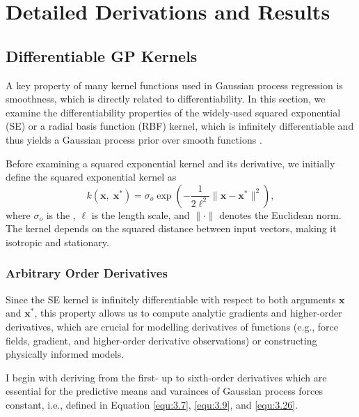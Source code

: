 \chapter{Detailed Derivations and Results} \label{c:A}

\section{Differentiable GP Kernels} \label{sec:A.1}

A key property of many kernel functions used in Gaussian process regression is smoothness, which is directly related to differentiability. In this section, we examine the differentiability properties of the widely-used squared exponential (SE) or a radial basis function (RBF) kernel, which is infinitely differentiable and thus yields a Gaussian process prior over smooth functions \cite{RasmussenW06, Solak2002}.

Before examining a squared exponential kernel and its derivative, we initially define the squared exponential kernel as
\begin{equation} \label{equ:A.1}
    k(\mathbf{x},\;\mathbf{x}^{*}) = \sigma_{o} \exp\left(-\frac{1}{2\ell^2} \|\mathbf{x} - \mathbf{x}^{*}\|^2\right),
\end{equation}
where $\sigma_{o}$ is the  , $\ell$ is the length scale, and $\|\cdot\|$ denotes the Euclidean norm. The kernel depends on the squared distance between input vectors, making it isotropic and stationary.

\subsection{Arbitrary Order Derivatives} \label{sec:A.1.1}

Since the SE kernel is infinitely differentiable with respect to both arguments $\mathbf{x}$ and $\mathbf{x}^{*}$,  this property allows us to compute analytic gradients and higher-order derivatives, which are crucial for modelling derivatives of functions (e.g., force fields, gradient, and higher-order derivative observations) or constructing physically informed models.

I begin with deriving from the first- up to sixth-order derivatives which are essential for the predictive means and varainces of Gaussian process forces constant, i.e., defined in Equation \eqref{equ:3.7}, \eqref{equ:3.9}, and \eqref{equ:3.26}.

